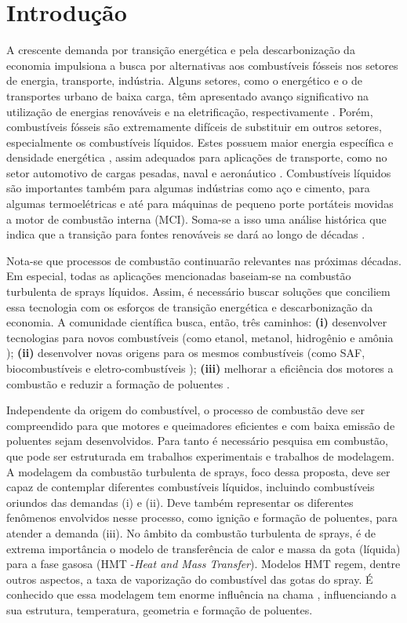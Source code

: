\section{Introdução} \label{sec:intro}

A crescente demanda por transição energética e pela descarbonização da economia impulsiona a busca por alternativas aos combustíveis fósseis nos setores de energia, transporte, indústria. 
Alguns setores, como o energético e o de transportes urbano de baixa carga, têm apresentado avanço significativo na utilização de energias renováveis e na eletrificação, respectivamente \cite{MasriA2021}. 
Porém, combustíveis fósseis são extremamente difíceis de substituir em outros setores, especialmente os combustíveis líquidos.
Estes possuem maior energia específica e densidade energética \cite{Bergthorson2017,Julien2017}, assim adequados para aplicações de transporte, como no setor automotivo de cargas pesadas, naval e aeronáutico \cite{MasriA2021}.
Combustíveis líquidos são importantes também para algumas indústrias como aço e cimento, para algumas termoelétricas e até para máquinas de pequeno porte portáteis movidas a motor de combustão interna (MCI).
Soma-se a isso uma análise histórica que indica que a transição para fontes renováveis se dará ao longo de décadas \cite{MasriA2021}.

Nota-se que processos de combustão continuarão relevantes nas próximas décadas.
Em especial, todas as aplicações mencionadas baseiam-se na combustão turbulenta de sprays líquidos.
Assim, é necessário buscar soluções que conciliem essa tecnologia com os esforços de transição energética e descarbonização da economia.
A comunidade científica busca, então, três caminhos: \textbf{(i)} desenvolver tecnologias para novos combustíveis (como  etanol, metanol, hidrogênio e amônia \cite{FAPESP_etanol_1,VerhelstS2019,TeohY2023,ElbazA2022}); \textbf{(ii)} desenvolver novas origens para os mesmos combustíveis (como SAF, biocombustíveis e eletro-combustíveis \cite{BenJames-SAF,BergthorsonJ2015,WestbrookC2019,PalysM2022}); \textbf{(iii)} melhorar a eficiência dos motores a combustão e reduzir a formação de poluentes \cite{MasriA2021}.

Independente da origem do combustível, o processo de combustão deve ser compreendido para que motores e queimadores eficientes e com baixa emissão de poluentes sejam desenvolvidos.
Para tanto é necessário pesquisa em combustão, que pode ser estruturada em trabalhos experimentais e trabalhos de modelagem.
A modelagem da combustão turbulenta de sprays, foco dessa proposta, deve ser capaz de contemplar diferentes combustíveis líquidos, incluindo combustíveis oriundos das demandas (i) e (ii).
Deve também representar os diferentes fenômenos envolvidos nesse processo, como ignição e formação de poluentes, para atender a demanda (iii).
No âmbito da combustão turbulenta de sprays, é de extrema importância o modelo de transferência de calor e massa da gota (líquida) para a fase gasosa (HMT -\emph{Heat and Mass Transfer}).
Modelos HMT regem, dentre outros aspectos, a taxa de vaporização do combustível das gotas do spray.
É conhecido que essa modelagem tem enorme influência na chama \cite{JennyB2012}, influenciando a sua estrutura, temperatura, geometria e formação de poluentes.


